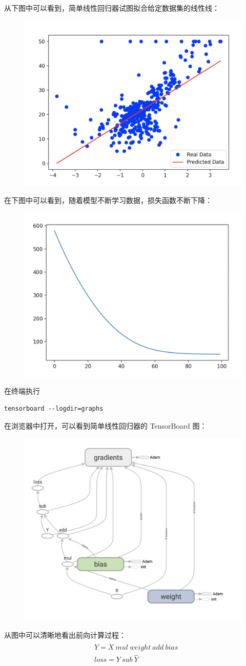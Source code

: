 \documentclass[12pt]{article}
\begin{document}
从下图中可以看到，简单线性回归器试图拟合给定数据集的线性线：
\begin{figure}[H]
    \centering
    \includegraphics[width=.4\textwidth]{fig/codes/tf_simple_linear_regression_1.png}
\end{figure}

在下图中可以看到，随着模型不断学习数据，损失函数不断下降：
\begin{figure}[H]
    \centering
    \includegraphics[width=.4\textwidth]{fig/codes/tf_simple_linear_regression_2.png}
\end{figure}

在终端执行
\begin{lstlisting}
tensorboard --logdir=graphs
\end{lstlisting}
在浏览器中打开，可以看到简单线性回归器的 TensorBoard 图：
\begin{figure}[H]
    \centering
    \includegraphics[width=.6\textwidth]{fig/codes/tf_simple_linear_regression_3.png}
\end{figure}

从图中可以清晰地看出前向计算过程：
\begin{align*}
& \hat{Y} = X \ mul \ weight \ add \ bias \\
& loss = Y \ sub \ \hat{Y} \\
\end{align*}
\end{document}
